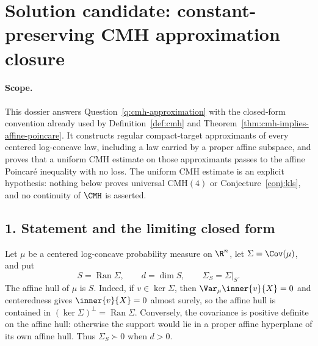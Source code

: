 \documentclass[../main.tex]{subfiles}
\begin{document}
%
\section*{Solution candidate: constant-preserving CMH approximation closure}
\label{sec:sol-cmh-approximation}

\paragraph{Scope.}
This dossier answers Question~\ref{q:cmh-approximation} with the closed-form convention already
used by Definition~\ref{def:cmh} and
Theorem~\ref{thm:cmh-implies-affine-poincare}.  It constructs regular compact-target
approximants of every centered log-concave law, including a law carried by a proper affine
subspace, and proves that a uniform CMH estimate on those approximants passes to the affine
Poincar\'e inequality with no loss.  The uniform CMH estimate is an explicit hypothesis: nothing
below proves universal $\mathrm{CMH}(4)$ or Conjecture~\ref{conj:kls}, and no continuity of
$\CMH$ is asserted.

\subsection*{1. Statement and the limiting closed form}

Let $\mu$ be a centered log-concave probability measure on $\R^n$, let
$\Sigma=\Cov(\mu)$, and put
\[
  S=\operatorname{Ran}\Sigma,
  \qquad d=\dim S,
  \qquad \Sigma_S=\Sigma|_S.
\]
The affine hull of $\mu$ is $S$.  Indeed, if $v\in\ker\Sigma$, then
$\Var_\mu\inner{v}{X}=0$ and centeredness gives $\inner{v}{X}=0$ almost surely, so the affine hull is
contained in $(\ker\Sigma)^\perp=\operatorname{Ran}\Sigma$.  Conversely, the covariance is
positive definite on the affine hull: otherwise the support would lie in a proper affine
hyperplane of its own affine hull.  Thus $\Sigma_S\succ0$ when $d>0$.
\end{document}
